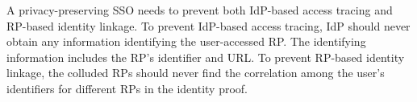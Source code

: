 A privacy-preserving SSO needs to prevent both IdP-based access tracing and RP-based identity linkage.
To prevent IdP-based access tracing,  IdP should never obtain any information identifying the user-accessed RP.
The identifying information includes the RP's identifier and URL.
To prevent RP-based identity linkage, the colluded RPs should never find the correlation among the user's identifiers for different RPs in the identity proof.

